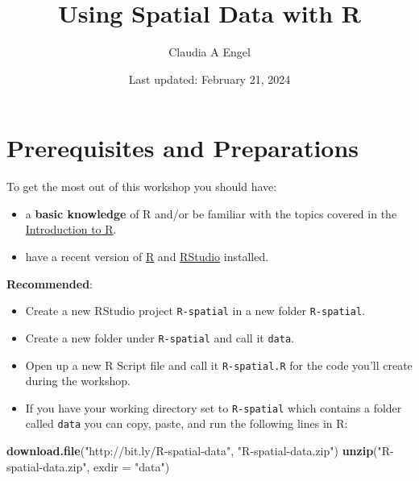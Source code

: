 \documentclass[
]{book}
\title{Using Spatial Data with R}
\author{Claudia A Engel}
\date{Last updated: February 21, 2024}
\newenvironment{Shaded}{\begin{snugshade}}{\end{snugshade}}
\newcommand{\AttributeTok}[1]{\textcolor[rgb]{0.13,0.29,0.53}{#1}}
\newcommand{\FunctionTok}[1]{\textcolor[rgb]{0.13,0.29,0.53}{\textbf{#1}}}
\newcommand{\NormalTok}[1]{#1}
\newcommand{\StringTok}[1]{\textcolor[rgb]{0.31,0.60,0.02}{#1}}
\providecommand{\tightlist}{%
  \setlength{\itemsep}{0pt}\setlength{\parskip}{0pt}}
\begin{document}
\maketitle

{
\setcounter{tocdepth}{1}
\tableofcontents
}
\hypertarget{prerequisites-and-preparations}{%
\chapter*{Prerequisites and Preparations}\label{prerequisites-and-preparations}}

To get the most out of this workshop you should have:

\begin{itemize}
\tightlist
\item
  a \textbf{basic knowledge} of R and/or be familiar with the topics covered in the \href{https://cengel.github.io/R-intro/}{Introduction to R}.
\item
  have a recent version of \href{https://cran.r-project.org/}{R} and \href{https://www.rstudio.com/}{RStudio} installed.
\end{itemize}

\textbf{Recommended}:

\begin{itemize}
\item
  Create a new RStudio project \texttt{R-spatial} in a new folder \texttt{R-spatial}.
\item
  Create a new folder under \texttt{R-spatial} and call it \texttt{data}.
\item
  Open up a new R Script file and call it \texttt{R-spatial.R} for the code you'll create during the workshop.
\item
  If you have your working directory set to \texttt{R-spatial} which contains a folder called \texttt{data} you can copy, paste, and run the following lines in R:
\end{itemize}

\begin{Shaded}
\begin{Highlighting}[]
\FunctionTok{download.file}\NormalTok{(}\StringTok{"http://bit.ly/R{-}spatial{-}data"}\NormalTok{, }\StringTok{"R{-}spatial{-}data.zip"}\NormalTok{)}
\FunctionTok{unzip}\NormalTok{(}\StringTok{"R{-}spatial{-}data.zip"}\NormalTok{, }\AttributeTok{exdir =} \StringTok{"data"}\NormalTok{)}
\end{Highlighting}
\end{Shaded}
\end{document}
